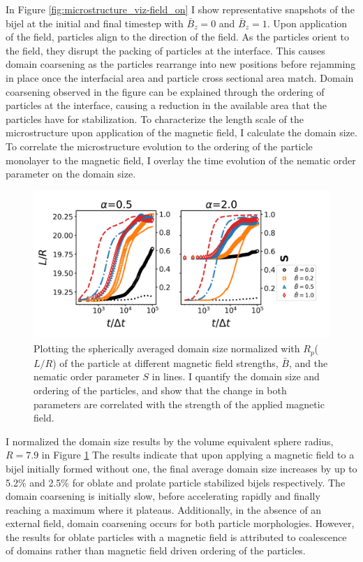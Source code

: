 In Figure \ref{fig:microstructure_viz-field_on} I show representative snapshots of the bijel at the initial and final timestep with $\bar{B}_z = 0$ and $\bar{B}_z = 1$. 
Upon application of the field, particles align to the direction of the field. As the particles orient to the field, they disrupt the packing of particles at
the interface. This causes domain coarsening as the particles rearrange into new positions before rejamming in place once the interfacial
area and particle cross sectional area match. Domain coarsening observed in the figure can be explained through the ordering of particles at the interface, causing a 
reduction in the available area that the particles have for stabilization. To characterize the length scale of the microstructure upon application of the magnetic field,
I calculate the domain size. To correlate the microstructure evolution to the ordering of the particle monolayer to the magnetic field, I overlay the time evolution of the
nematic order parameter on the domain size. \cite{veerman_phase_1992} 

\begin{figure} 
\centering 
\includegraphics[scale=0.5]{../figures/results/paper2/domain_size-field_on.png} 
\caption{Plotting the spherically averaged domain size normalized with $R_p$($L/R$) of the particle at different magnetic field strengths, $\bar{B}$, and the nematic order 
         parameter $S$ in lines. I quantify the domain size and ordering of the particles, and show that the change in both parameters are correlated with the strength of 
         the applied magnetic field.} 
\label{fig:domain_size-field_on} 
\end{figure}

I normalized the domain size results by the volume equivalent sphere radius, $R = 7.9$ in Figure \ref{fig:domain_size-field_on} The results indicate that upon 
applying a magnetic field to a bijel initially formed without one, the final average domain size increases by up to 5.2\% and 2.5\% for oblate and 
prolate particle stabilized bijels respectively. The domain coarsening is initially slow, before accelerating rapidly and finally reaching a maximum where it plateaus. 
Additionally, in the absence of an external field, domain coarsening occurs for both particle morphologies. However, the results
for oblate particles with a magnetic field is attributed to coalescence of domains rather than magnetic field driven ordering of the particles.

